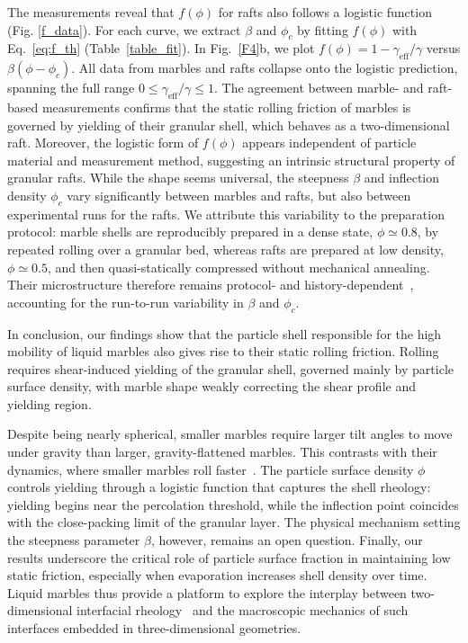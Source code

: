 \documentclass[twocolumn, prl,
 amsmath,amssymb,
 superscriptaddress,aps,
]{revtex4-2}
\begin{document}
The measurements reveal that $f(\phi)$ for rafts also follows a logistic function (Fig. \ref{f_data}). For each curve, we extract $\beta$ and $\phi_c$ by fitting $f(\phi)$ with Eq.~\ref{eq:f_th} (Table~\ref{table_fit}).
In Fig.~\ref{F4}b, we plot $f(\phi)=1-\gamma_\mathrm{eff}/\gamma$ versus $\beta(\phi-\phi_c)$. All data from marbles and rafts collapse onto the logistic prediction, spanning the full range $0\leq\gamma_\mathrm{eff}/\gamma\leq1$. The agreement between marble- and raft-based measurements confirms that the static rolling friction of marbles is governed by yielding of their granular shell, which behaves as a two-dimensional raft. Moreover, the logistic form of $f(\phi)$ appears independent of particle material and measurement method, suggesting an intrinsic structural property of granular rafts. While the shape seems universal, the steepness $\beta$ and inflection density $\phi_c$ vary significantly between marbles and rafts, but also between experimental runs for the rafts.
We attribute this variability to the preparation protocol: marble shells are reproducibly prepared in a dense state, $\phi\simeq0.8$, by repeated rolling over a granular bed, whereas rafts are prepared at low density, $\phi\simeq0.5$, and then quasi-statically compressed without mechanical annealing. Their microstructure therefore remains protocol- and history-dependent~\cite{planchette2025unjamming}, accounting for the run-to-run variability in $\beta$ and $\phi_c$.

In conclusion, our findings show that the particle shell responsible for the high mobility of liquid marbles also gives rise to their static rolling friction. Rolling requires shear-induced yielding of the granular shell, governed mainly by particle surface density, with marble shape weakly correcting the shear profile and yielding region.

Despite being nearly spherical, smaller marbles require larger tilt angles to move under gravity than larger, gravity-flattened marbles. This contrasts with their dynamics, where smaller marbles roll faster~\cite{mahadevan1999rolling,aussillous2001liquid}. The particle surface density $\phi$ controls yielding through a logistic function that captures the shell rheology: yielding begins near the percolation threshold, while the inflection point coincides with the close-packing limit of the granular layer. The physical mechanism setting the steepness parameter $\beta$, however, remains an open question.
Finally, our results underscore the critical role of particle surface fraction in maintaining low static friction, especially when evaporation increases shell density over time. Liquid marbles thus provide a platform to explore the interplay between two-dimensional interfacial rheology~\cite{fuller2012complex,ji2020interfacial} and the macroscopic mechanics of such interfaces embedded in three-dimensional geometries.
\\
\end{document}
